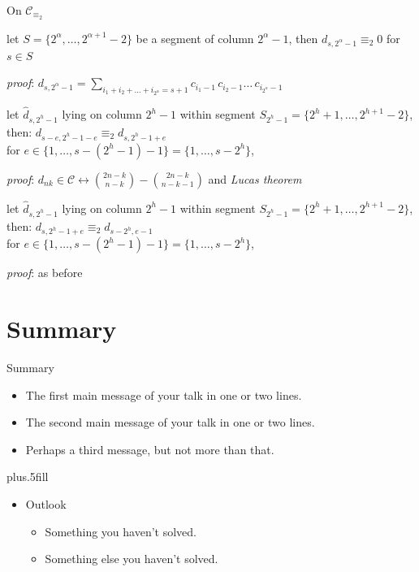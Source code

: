 \documentclass[10pt,serif, professionalfont]{beamer}
\begin{document}
\begin{frame}{On $\mathcal{C}_{\equiv_{2}}$}
    \begin{theorem}
        let  $S=\lbrace2^{\alpha},\ldots,2^{\alpha+1}-2\rbrace$ be a segment of 
        column $2^{\alpha}-1$, then $d_{s,2^{\alpha}-1}\equiv_{2}0$ for $s\in S$
    \end{theorem}
    \emph{proof}: $d_{s, 2^{\alpha}-1} = \sum_{i_{1}+i_{2}+\ldots+i_{2^{\alpha}}=s+1}
            {c_{i_{1}-1}\,c_{i_{2}-1}\ldots\,c_{i_{2^{\alpha}}-1}}$
    \pause
    \begin{theorem}
    let $\hat{d}_{s,2^{h}-1}$ lying on column $2^{h}-1$ within segment 
    $S_{2^{h}-1}=\lbrace 2^{h}+1,\ldots,2^{h+1}-2 \rbrace$, then:
        $d_{s-e,2^{h}-1-e} \equiv_{2} d_{s,2^{h}-1+e}$ \\
    for $e\in\lbrace1,\ldots,s-(2^{h}-1)-1\rbrace=\lbrace1,\ldots,s-2^{h}\rbrace$,
    \end{theorem}
    \emph{proof}: $ d_{nk}\in\mathcal{C}\leftrightarrow{{2n-k}\choose{n-k}} - {{2n-k}\choose{n-k-1}}$ and \emph{Lucas theorem}
    \pause
    \begin{theorem}
    let $\hat{d}_{s,2^{h}-1}$ lying on column $2^{h}-1$ within segment 
    $S_{2^{h}-1}=\lbrace 2^{h}+1,\ldots,2^{h+1}-2 \rbrace$, then:
        $d_{s,2^{h}-1+e} \equiv_{2} d_{s-2^{h},e-1} $ \\
    for $e\in\lbrace1,\ldots,s-(2^{h}-1)-1\rbrace=\lbrace1,\ldots,s-2^{h}\rbrace$,
    \end{theorem}
    \emph{proof}: as before
        
\end{frame}



\section*{Summary}

\begin{frame}{Summary}

  \begin{itemize}
  \item
    The \alert{first main message} of your talk in one or two lines.
  \item
    The \alert{second main message} of your talk in one or two lines.
  \item
    Perhaps a \alert{third message}, but not more than that.
  \end{itemize}
  
  \vskip0pt plus.5fill
  \begin{itemize}
  \item
    Outlook
    \begin{itemize}
    \item
      Something you haven't solved.
    \item
      Something else you haven't solved.
    \end{itemize}
  \end{itemize}
\end{frame}
\end{document}
